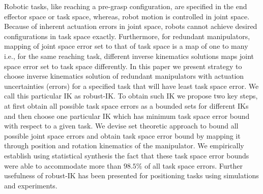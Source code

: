 Robotic tasks, like reaching a pre-grasp configuration, are specified in the end effector space or task space, whereas, robot motion is controlled in joint space. Because of inherent actuation errors in joint space, robots cannot achieve desired configurations in task space exactly. Furthermore, for redundant manipulators, mapping of joint space error set to that of task space is a map of one to many i.e., for the same reaching task, different inverse kinematics solutions maps joint space error set to task space differently. In this paper we present strategy to choose inverse kinematics solution of redundant manipulators with actuation uncertainties (errors) for a specified task that will have least task space error. We call this particular IK as robust-IK. To obtain such IK we propose two key steps, at first obtain all possible task space errors as a bounded sets for different IKs and then choose one particular IK which has minimum task space error bound with respect to a given task. We devise set theoretic approach to bound all possible joint space errors and obtain task space error bound by mapping it through position and rotation kinematics of the manipulator. We empirically establish using statistical synthesis the fact that these task space error bounds were able to accommodate more than $98.5\%$ of all task space errors. Further usefulness of robust-IK has been presented for positioning tasks using simulations and experiments.
